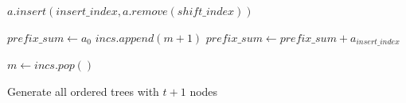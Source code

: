 \begin{algorithm}
\begin{algorithmic}
            \vspace{0.75em}
            \State $a.insert(insert\_index,a.remove(shift\_index))$ 
            \State {}
            
            \vspace{0.75em}
                \State $prefix\_sum \gets a_0$
                \State $incs.append(m+1)$
                \EndIf 
                \Else
                \State $prefix\_sum \gets prefix\_sum+a_{insert\_index}$
            \EndIf
           
            \State \Return
            \Else
            \State $m \gets incs.pop()$
            \EndIf
            
            
            

        \EndWhile
       
       
    \EndFunction
    \end{algorithmic}
    \caption{Generate all ordered trees with $t+1$ nodes}
    \label{alg:prefix}
\end{algorithm}
